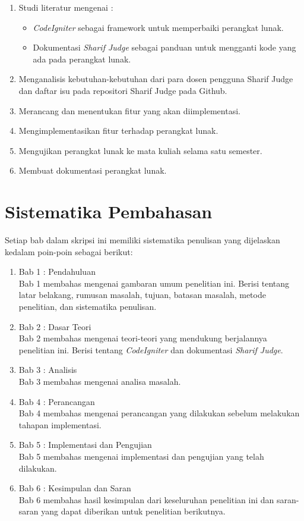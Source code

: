 \begin{enumerate}
	\item Studi literatur mengenai :
		\begin{itemize}
			\item \textit{CodeIgniter} sebagai framework untuk memperbaiki perangkat lunak.
			\item Dokumentasi \textit{Sharif Judge} sebagai panduan untuk mengganti kode yang ada pada perangkat lunak.
		\end{itemize}
	\item Menganalisis kebutuhan-kebutuhan dari para dosen pengguna Sharif Judge dan daftar isu pada repositori Sharif Judge pada Github.
	\item Merancang dan menentukan fitur yang akan diimplementasi.
	\item Mengimplementasikan fitur terhadap perangkat lunak.
	\item Mengujikan perangkat lunak ke mata kuliah selama satu semester.
	\item Membuat dokumentasi perangkat lunak.
\end{enumerate}

\section{Sistematika Pembahasan}
\label{sec:sispem}
Setiap bab dalam skripsi ini memiliki sistematika penulisan yang dijelaskan kedalam poin-poin sebagai berikut:

\begin{enumerate}
	\item Bab 1 : Pendahuluan \\
	Bab 1 membahas mengenai gambaran umum penelitian ini. Berisi tentang latar belakang, rumusan masalah, tujuan, batasan masalah, metode penelitian, dan sistematika penulisan.
	
	\item Bab 2 : Dasar Teori \\
	Bab 2 membahas mengenai teori-teori yang mendukung berjalannya penelitian ini. Berisi tentang \textit{CodeIgniter} dan dokumentasi \textit{Sharif Judge}.
	
	\item Bab 3 : Analisis \\
	Bab 3 membahas mengenai analisa masalah.
	
	\item Bab 4 : Perancangan \\
	Bab 4 membahas mengenai perancangan yang dilakukan sebelum melakukan tahapan implementasi.
	
	\item Bab 5 : Implementasi dan Pengujian \\
	Bab 5 membahas mengenai implementasi dan pengujian yang telah dilakukan.
	
	\item Bab 6 : Kesimpulan dan Saran \\
	Bab 6 membahas hasil kesimpulan dari keseluruhan penelitian ini dan saran-saran yang dapat diberikan untuk penelitian berikutnya.
\end{enumerate}